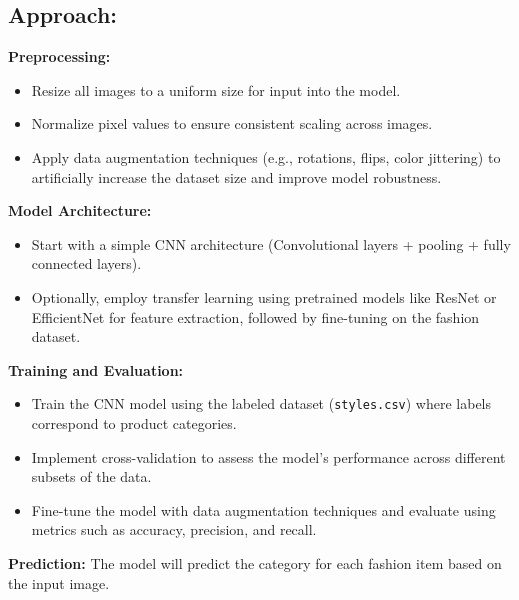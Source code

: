 \documentclass[12pt]{article}
\begin{document}
\subsection*{Approach:}
\textbf{Preprocessing:}
\begin{itemize}
    \item Resize all images to a uniform size for input into the model.
    \item Normalize pixel values to ensure consistent scaling across images.
    \item Apply data augmentation techniques (e.g., rotations, flips, color jittering) to artificially increase the dataset size and improve model robustness.
\end{itemize}



\textbf{Model Architecture:}
\begin{itemize}
    \item Start with a simple CNN architecture (Convolutional layers + pooling + fully connected layers).
    \item Optionally, employ transfer learning using pretrained models like ResNet or EfficientNet for feature extraction, followed by fine-tuning on the fashion dataset.
\end{itemize}



\textbf{Training and Evaluation:}
\begin{itemize}
    \item Train the CNN model using the labeled dataset (\texttt{styles.csv}) where labels correspond to product categories.
    \item Implement cross-validation to assess the model's performance across different subsets of the data.
    \item Fine-tune the model with data augmentation techniques and evaluate using metrics such as accuracy, precision, and recall.
\end{itemize}



\textbf{Prediction:}
The model will predict the category for each fashion item based on the input image.
\end{document}
